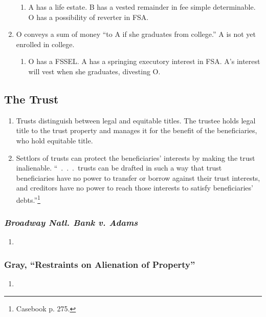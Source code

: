 \begin{enumerate}
\begin{enumerate}
        \item A has a life estate. B has a vested remainder in fee simple 
        determinable. O has a possibility of reverter in FSA.
    \end{enumerate}
    \item O conveys a sum of money ``to A if she graduates from college.'' A 
    is not yet enrolled in college.
    \begin{enumerate}
        \item O has a FSSEL. A has a springing executory interest in FSA. A's 
        interest will vest when she graduates, divesting O.
    \end{enumerate}
\end{enumerate}

\subsection{The Trust}

\begin{enumerate}
    \item Trusts distinguish between legal and equitable titles. The trustee 
    holds legal title to the trust property and manages it for the benefit of 
    the beneficiaries, who hold equitable title.
    \item Settlors of trusts can protect the beneficiaries' interests by 
    making the trust inalienable. ``~.~.~.~trusts can be drafted in such a way 
    that trust beneficiaries have no power to transfer or borrow against their 
    trust interests, and creditors have no power to reach those interests to 
    satisfy beneficiaries' debts.''\footnote{Casebook p. 275.}
\end{enumerate}

\subsubsection{\emph{Broadway Natl. Bank v. Adams}}

\begin{enumerate}
    \item %
\end{enumerate}

\subsubsection{Gray, ``Restraints on Alienation of Property''}

\begin{enumerate}
    \item %
\end{enumerate}

